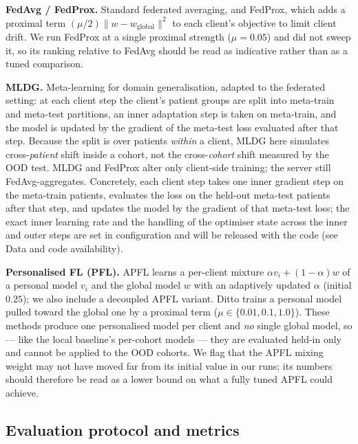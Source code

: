 \documentclass[10pt,letterpaper]{article}
\begin{document}
\textbf{FedAvg / FedProx.} Standard federated averaging, and FedProx, which adds
a proximal term $(\mu/2)\lVert w - w_{\text{global}}\rVert^2$ to each client's
objective to limit client drift. We run FedProx at a single proximal strength
($\mu=0.05$) and did not sweep it, so its ranking relative to FedAvg should be
read as indicative rather than as a tuned comparison.

\textbf{MLDG.} Meta-learning for domain generalisation, adapted to the federated
setting: at each client step the client's patient groups are split into
meta-train and meta-test partitions, an inner adaptation step is taken on
meta-train, and the model is updated by the gradient of the meta-test loss
evaluated after that step. Because the split is over patients \emph{within} a
client, MLDG here simulates cross-\emph{patient} shift inside a cohort, not the
cross-\emph{cohort} shift measured by the OOD test. MLDG and FedProx alter only
client-side training; the server still FedAvg-aggregates. Concretely, each client
step takes one inner gradient step on the meta-train patients, evaluates the loss
on the held-out meta-test patients after that step, and updates the model by the
gradient of that meta-test loss; the exact inner learning rate and the handling
of the optimiser state across the inner and outer steps are set in configuration
and will be released with the code (see Data and code availability).

\textbf{Personalised FL (PFL).} APFL learns a per-client mixture
$\alpha v_i + (1-\alpha)w$ of a personal model $v_i$ and the global model $w$
with an adaptively updated $\alpha$ (initial $0.25$); we also include a decoupled
APFL variant. Ditto trains a personal model pulled toward the global one by a
proximal term ($\mu\in\{0.01,0.1,1.0\}$). These methods produce one personalised
model per client and \emph{no} single global model, so --- like the local
baseline's per-cohort models --- they are evaluated held-in only and cannot be
applied to the OOD cohorts. We flag that the APFL mixing weight may not have moved
far from its initial value in our runs; its numbers should therefore be read as a
lower bound on what a fully tuned APFL could achieve.

\subsection*{Evaluation protocol and metrics}
\end{document}
